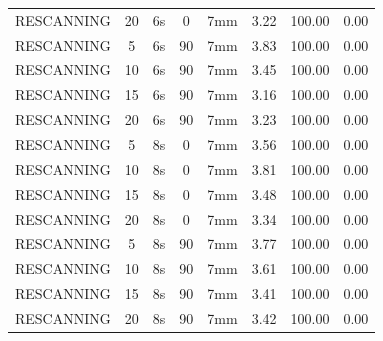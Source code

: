 \documentclass[type=dr, dr=rernat, accentcolor=tud7b,colorbacktitle, bigchapter, openright, twoside, 12pt ]{tudthesis}
\begin{document}
\begin{table}[H]
\begin{tabular}{|c|c||c|c|c||c|c|c|}
RESCANNING & 20 & 6s & 0 & 7mm & 3.22 & 100.00 & 0.00 \\
RESCANNING & 5 & 6s & 90 & 7mm & 3.83 & 100.00 & 0.00 \\
RESCANNING & 10 & 6s & 90 & 7mm & 3.45 & 100.00 & 0.00 \\
RESCANNING & 15 & 6s & 90 & 7mm & 3.16 & 100.00 & 0.00 \\
RESCANNING & 20 & 6s & 90 & 7mm & 3.23 & 100.00 & 0.00 \\
RESCANNING & 5 & 8s & 0 & 7mm & 3.56 & 100.00 & 0.00 \\
RESCANNING & 10 & 8s & 0 & 7mm & 3.81 & 100.00 & 0.00 \\
RESCANNING & 15 & 8s & 0 & 7mm & 3.48 & 100.00 & 0.00 \\
RESCANNING & 20 & 8s & 0 & 7mm & 3.34 & 100.00 & 0.00 \\
RESCANNING & 5 & 8s & 90 & 7mm & 3.77 & 100.00 & 0.00 \\
RESCANNING & 10 & 8s & 90 & 7mm & 3.61 & 100.00 & 0.00 \\
RESCANNING & 15 & 8s & 90 & 7mm & 3.41 & 100.00 & 0.00 \\
RESCANNING & 20 & 8s & 90 & 7mm & 3.42 & 100.00 & 0.00 \\
     \hline\hline 
  \end{tabular}
\end{table}   
\end{document}
